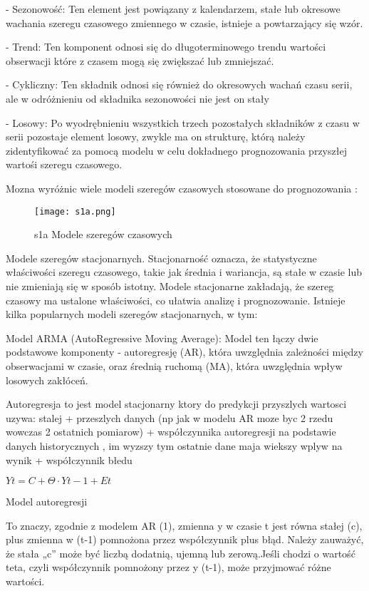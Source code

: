 - Sezonowość: Ten element jest powiązany z kalendarzem,  stałe lub okresowe wachania szeregu czasowego zmiennego w czasie,  istnieje a powtarzający się wzór.

- Trend: Ten komponent odnosi się do długoterminowego trendu wartości obserwacji które z czasem mogą się zwiększać lub zmniejszać.

- Cykliczny: Ten składnik odnosi się również do okresowych wachań czasu serii, ale w odróżnieniu od składnika sezonowości nie jest on stały 

- Losowy: Po wyodrębnieniu wszystkich trzech pozostałych składników z czasu w serii pozostaje element losowy, zwykle ma on strukturę, którą należy zidentyfikować za pomocą modelu w celu dokładnego prognozowania przyszłej wartośi szeregu czasowego.
\cite{Shekh2018}


Mozna wyróżnic wiele modeli szeregów czasowych stosowane do prognozowania :

\begin{figure}[h!]
    \label{fig:S1}
    \centering \texttt{[image: s1a.png]}
    \caption{s1a Modele szeregów czasowych\cite{szer2009}}
\end{figure}

Modele szeregów stacjonarnych. Stacjonarność oznacza, że statystyczne właściwości szeregu czasowego, takie jak średnia i wariancja, są stałe w czasie lub nie zmieniają się w sposób istotny.  Modele stacjonarne zakładają, że szereg czasowy ma ustalone właściwości, co ułatwia analizę i prognozowanie. Istnieje kilka popularnych modeli szeregów stacjonarnych, w tym: 

Model ARMA (AutoRegressive Moving Average): Model ten łączy dwie podstawowe komponenty - autoregresję (AR), która uwzględnia zależności między obserwacjami w czasie, oraz średnią ruchomą (MA), która uwzględnia wpływ losowych zakłóceń. 

Autoregresja to jest model stacjonarny ktory do predykcji przyszlych wartosci uzywa: stalej + przeszlych danych (np jak w modelu AR moze byc 2 rzedu wowczas 2 ostatnich pomiarow) + współczynnika autoregresji  na podstawie danych historycznych , im wyzszy tym ostatnie dane maja wiekszy wplyw na wynik + współczynnik błedu \cite{auto2023}\cite{autor2023}



\(Yt = C + \Theta \cdot Y{t-1} + Et\)

Model autoregresji\cite{mod2023}


To znaczy, zgodnie z modelem AR (1), zmienna y w czasie t jest równa stałej (c), plus zmienna w (t-1) pomnożona przez współczynnik plus błąd. Należy zauważyć, że stała „c” może być liczbą dodatnią, ujemną lub zerową.Jeśli chodzi o wartość teta, czyli współczynnik pomnożony przez y (t-1), może przyjmować różne wartości.

